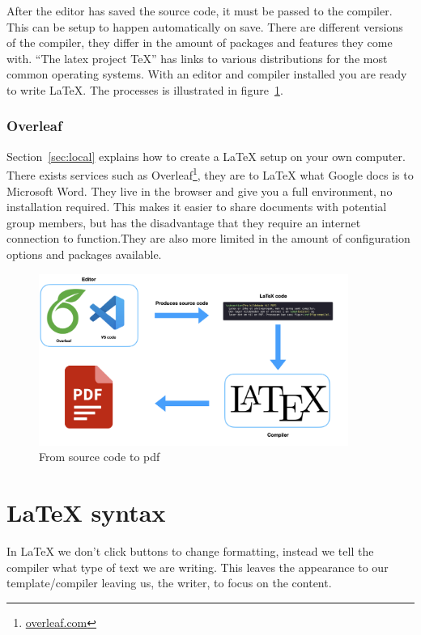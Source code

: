 \documentclass{article}
\begin{document}
   After the editor has saved the source code, it must be passed to the compiler.
   This can be setup to happen automatically on save. There are different versions
   of the compiler, they differ in the amount of packages and features they come
   with.  ``The latex project TeX''\cite{texLive} has links to various distributions
   for the most common operating systems.
   With an editor and compiler installed you are ready to write \LaTeX{}.
   The processes is illustrated in figure~\ref{fig:compile}.


   \subsubsection{Overleaf}
     Section~\ref{sec:local} explains how to create a \LaTeX{} setup on your own
     computer. There exists services such as Overleaf\footnote{\url{overleaf.com}},
     they are to \LaTeX{} what Google docs is to Microsoft Word. They live in the
     browser and give you a full environment, no installation required. This makes
     it easier to share documents with potential group members, but has the
     disadvantage that they require an internet connection to function.They are
     also more limited in the amount of configuration options and packages available.

     \begin{figure}[h]
       \centering
       \includegraphics[width=0.9\textwidth]{../assets/compile_en.png}
       \caption{From source code to pdf}\label{fig:compile}
     \end{figure}


\section{\LaTeX{} syntax}
 In \LaTeX{} we don't click buttons to change formatting, instead we tell the
 compiler what type of text we are writing. This leaves the appearance to our
 template/compiler leaving us, the writer, to focus on the content.
\end{document}
